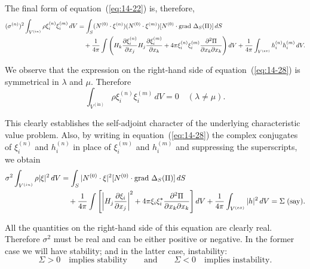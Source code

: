 The final form of equation~(\ref{eq:14-22}) is, therefore,
\begin{align}
\label{eq:14-28}
(\sigma^{(n)})^2 \int_{V^{(\mathrm{in})}} \rho \xi_i^{(n)} \xi_i^{(m)} \, dV &= \int_S (\mathbf{N}^{(0)} \cdot \boldsymbol{\xi}^{(n)})(\mathbf{N}^{(0)} \cdot \boldsymbol{\xi}^{(m)})[\mathbf{N}^{(0)} \cdot \operatorname{grad}\, \Delta_S(\Pi)] \, dS \notag \\
&\quad + \frac{1}{4\pi} \int \left( H_k \frac{\partial \xi_i^{(n)}}{\partial x_j} H_j \frac{\partial \xi_i^{(m)}}{\partial x_k} + 4\pi \xi_i^{(n)} \xi_i^{(m)} \frac{\partial^2 \Pi}{\partial x_k \partial x_k} \right) dV + \frac{1}{4\pi} \int_{V^{(\mathrm{ex})}} h_i^{(n)} h_i^{(m)} \, dV.
\end{align}

We observe that the expression on the right-hand side of equation~(\ref{eq:14-28}) is symmetrical in $\lambda$ and $\mu$. Therefore
\begin{equation}
\label{eq:14-29}
\int_{V^{(\mathrm{in})}} \rho \xi_i^{(n)} \xi_i^{(m)} \, dV = 0 \quad (\lambda \neq \mu).
\end{equation}

This clearly establishes the self-adjoint character of the underlying characteristic value problem. Also, by writing in equation~(\ref{eq:14-28}) the complex conjugates of $\xi_i^{(n)}$ and $h_i^{(n)}$ in place of $\xi_i^{(m)}$ and $h_i^{(m)}$ and suppressing the superscripts, we obtain
\begin{align}
\label{eq:14-30}
\sigma^2 \int_{V^{(\mathrm{in})}} \rho |\boldsymbol{\xi}|^2 \, dV &= \int_S |\mathbf{N}^{(0)} \cdot \boldsymbol{\xi}|^2 [\mathbf{N}^{(0)} \cdot \operatorname{grad}\, \Delta_S(\Pi)] \, dS \notag \\
&\quad + \frac{1}{4\pi} \int \left[ \left| H_j \frac{\partial \xi_i}{\partial x_j} \right|^2 + 4\pi \xi_i \xi_i^* \frac{\partial^2 \Pi}{\partial x_k \partial x_k} \right] dV + \frac{1}{4\pi} \int_{V^{(\mathrm{ex})}} |\mathbf{h}|^2 \, dV = \Sigma \;\text{(say)}.
\end{align}

All the quantities on the right-hand side of this equation are clearly real. Therefore $\sigma^2$ must be real and can be either positive or negative. In the former case we will have stability; and in the latter case, instability:
\begin{equation}
\label{eq:14-31}
\Sigma > 0 \quad \text{implies stability} \qquad \text{and} \qquad \Sigma < 0 \quad \text{implies instability.}
\end{equation}

